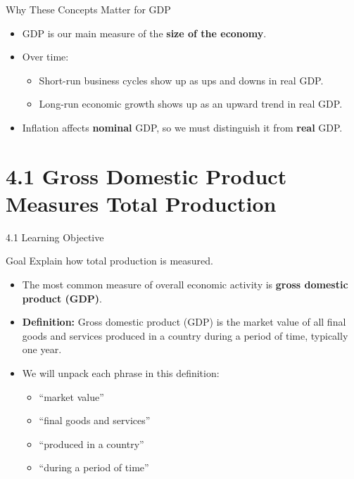 \documentclass[aspectratio=169]{beamer}
\begin{document}







\begin{frame}{Why These Concepts Matter for GDP}
\transfade
\begin{itemize}
  \item GDP is our main measure of the \textbf{size of the economy}.
  \item Over time:
  \begin{itemize}
    \item Short-run \alert{business cycles} show up as ups and downs in real GDP.
    \item Long-run \alert{economic growth} shows up as an upward trend in real GDP.
  \end{itemize}
  \item Inflation affects \textbf{nominal} GDP, so we must distinguish it from \textbf{real} GDP.
\end{itemize}
\end{frame}

\section{4.1 Gross Domestic Product Measures Total Production}

\begin{frame}{4.1 Learning Objective}
\transfade
\begin{block}{Goal}
Explain how total production is measured.
\end{block}
\begin{itemize}
  \item The most common measure of overall economic activity is \textbf{gross domestic product (GDP)}.
  \item \textbf{Definition:}  
  Gross domestic product (GDP) is the \alert{market value of all final goods and services produced in a country during a period of time}, typically one year.
  \item We will unpack each phrase in this definition:
  \begin{itemize}
    \item ``market value''
    \item ``final goods and services''
    \item ``produced in a country''
    \item ``during a period of time''
  \end{itemize}
\end{itemize}
\end{frame}
\end{document}
